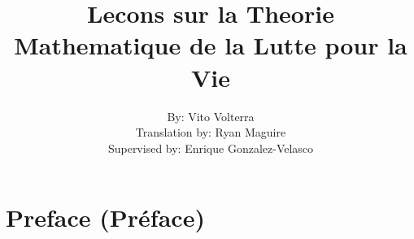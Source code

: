 \documentclass[crop=false,class=book,oneside]{standalone}
\begin{document}
    \ifstandalone
        \title{Lecons sur la Theorie Mathematique
               de la Lutte pour la Vie}
        \author{By: Vito Volterra\\
                Translation by: Ryan Maguire\\
                Supervised by: Enrique Gonzalez-Velasco}
        \date{\vspace{-5ex}}
        \maketitle
        \tableofcontents
        \listoffigures
        \listoftables
        \clearpage
    \fi
    \chapter*{Preface (Pr\'{e}face)}
\end{document}
